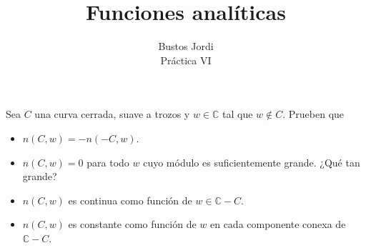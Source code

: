 \documentclass{article}
\newcommand{\C}{\mathbb{C}}
\newenvironment{theorem}[2][Ejercicio]{\begin{trivlist}
\item[\hskip\labelsep{\bfseries #1}\hskip\labelsep{\bfseries #2.}]}{\end{trivlist}}
\begin{document}
\title{Funciones analíticas}
\author{Bustos Jordi\\Práctica VI}

\maketitle

\begin{theorem}{1}
    Sea \( C \) una curva cerrada, suave a trozos y \( w \in \C \) tal que \( w \notin C \). Prueben que

    \begin{itemize}
        \item \( n(C, w) = -n(-C, w) \).
        \item \( n(C, w) = 0 \) para todo \( w \) cuyo módulo es suficientemente grande. ¿Qué tan grande?
        \item \( n(C, w) \) es continua como función de \( w \in \mathbb{C} - C \).
        \item \( n(C, w) \) es constante como función de \( w \) en cada componente conexa de \( \mathbb{C} - C \).
    \end{itemize}
\end{theorem}
\end{document}
